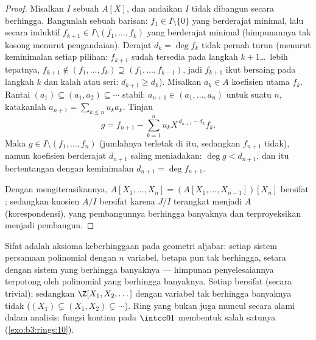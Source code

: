 \begin{proof}
Misalkan $I$ sebuah  $A[X]$, dan andaikan $I$ tidak dibangun secara
berhingga. Bangunlah sebuah barisan: $f_1 \in I \setminus \{0\}$ yang
berderajat minimal, lalu secara induktif $f_{k+1} \in I \setminus (f_1,
\dots, f_k)$ yang berderajat minimal (himpunannya tak kosong menurut
pengandaian). Derajat $d_k = \deg f_k$ tidak pernah turun (menurut
keminimalan setiap pilihan: $f_{k+1}$ sudah tersedia pada langkah
$k+1$\dots\ lebih tepatnya, $f_{k+1} \notin (f_1,\dots,f_k) \supseteq
(f_1, \dots, f_{k-1})$, jadi $f_{k+1}$ ikut bersaing pada langkah $k$ dan kalah
atau seri: $d_{k+1} \geq d_k$). Misalkan $a_k \in A$ koefisien utama
$f_k$. Rantai  $(a_1) \subseteq (a_1,
a_2) \subseteq \cdots$ stabil: $a_{n+1} \in (a_1, \dots,
a_n)$ untuk suatu $n$, katakanlah $a_{n+1} = \sum_{k\leq n} u_k a_k$.
Tinjau
\[
g = f_{n+1} - \sum_{k=1}^{n} u_k X^{\,d_{n+1} - d_k} f_k .
\]
Maka $g \in I \setminus (f_1, \dots, f_n)$ (jumlahnya terletak di
 itu, sedangkan $f_{n+1}$ tidak), namun koefisien berderajat
$d_{n+1}$ saling meniadakan: $\deg g < d_{n+1}$, dan itu bertentangan dengan
keminimalan $d_{n+1} = \deg f_{n+1}$.

Dengan mengiterasikannya, $A[X_1, \dots, X_n] = (A[X_1, \dots, X_{n-1}])[X_n]$
bersifat ; sedangkan kuosien $A/I$ bersifat  karena 
$J/I$ terangkat menjadi  $A$ (korespondensi), yang pembangunnya
berhingga banyaknya dan terproyeksikan menjadi pembangun.
\end{proof}

\begin{remark}\label{rem:b3:rings:noethmeaning}
Sifat  adalah aksioma keberhinggaan pada geometri aljabar: setiap
sistem persamaan polinomial dengan $n$ variabel, betapa pun tak berhingga,
setara dengan sistem yang berhingga banyaknya --- himpunan penyelesaiannya terpotong
oleh polinomial yang berhingga banyaknya. Setiap  bersifat 
(secara trivial); sedangkan $\Z[X_1, X_2, \dots]$ dengan variabel tak berhingga banyaknya
tidak ($(X_1) \subsetneq (X_1, X_2) \subsetneq \cdots$).
Ring yang bukan  juga muncul secara alami dalam analisis: fungsi
kontinu pada $\intcc01$ membentuk salah satunya (\cref{exo:b3:rings:10}).
\end{remark}

